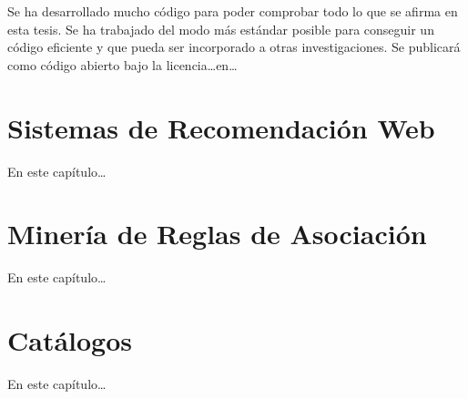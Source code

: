 Se ha desarrollado mucho código para poder comprobar todo lo que se afirma en esta tesis. Se ha trabajado del modo más estándar posible para conseguir un código eficiente y que pueda ser incorporado a otras investigaciones. Se publicará como código abierto bajo la licencia\ldots en\ldots




\section{Sistemas de Recomendación Web}
En este capítulo\ldots

%
%
%   


%
%
%   



\section{Minería de Reglas de Asociación}
En este capítulo\ldots




\section{Catálogos}
En este capítulo\ldots


{\tiny

}



